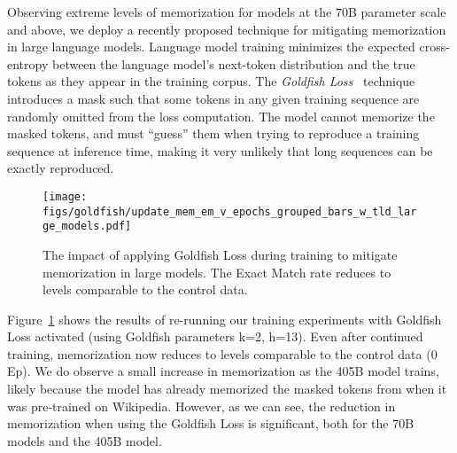 Observing extreme levels of memorization for models at the $70$B parameter
scale and above, we deploy a recently proposed technique for mitigating
memorization in large language models. Language model training
minimizes the expected cross-entropy between the language model's next-token
distribution and the true tokens as they appear in the training corpus. The
\textit{Goldfish Loss}~\cite{hans2024goldfish} technique introduces a mask such that some
tokens in any given training sequence are randomly omitted from the loss
computation. The model cannot memorize the masked tokens, and must ``guess''
them when trying to reproduce a training sequence at inference time, making it
very unlikely that long sequences can be exactly reproduced.

\begin{figure}[h]
	\centering
	\texttt{[image: figs/goldfish/update\_mem\_em\_v\_epochs\_grouped\_bars\_w\_tld\_large\_models.pdf]}
    \caption{The impact of applying Goldfish Loss during training to mitigate
memorization in large models. The Exact Match rate reduces to levels comparable
to the control data.}
    \label{fig:goldfish}
\end{figure}

Figure~\ref{fig:goldfish} shows the results of re-running our training
experiments with Goldfish Loss activated (using Goldfish parameters k=2, h=13).
Even after continued training, memorization now reduces to levels comparable to the
control data (0 Ep). We do observe a small increase in memorization as the 405B
model trains, likely because the model has already memorized the masked tokens
from when it was pre-trained on Wikipedia. However, as we can see, the reduction in memorization when using the Goldfish Loss is significant, both for the 70B models and the 405B model.

